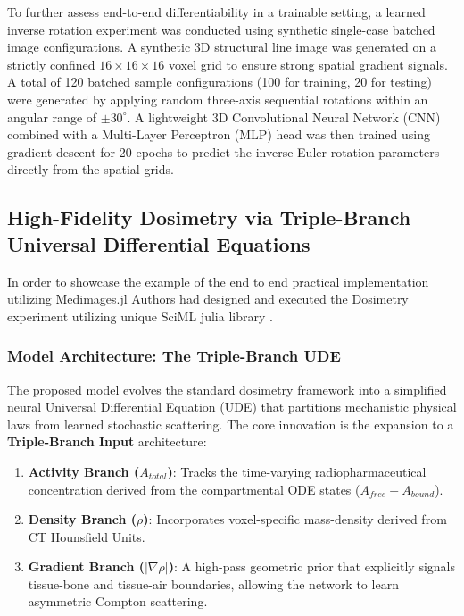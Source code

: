 \documentclass[a4paper,10pt]{elsarticle}
\begin{document}
To further assess end-to-end differentiability in a trainable setting, a learned inverse rotation experiment was conducted using synthetic single-case batched image configurations. A synthetic 3D structural line image was generated on a strictly confined $16 \times 16 \times 16$ voxel grid to ensure strong spatial gradient signals. A total of 120 batched sample configurations (100 for training, 20 for testing) were generated by applying random three-axis sequential rotations within an angular range of $\pm 30^{\circ}$. A lightweight 3D Convolutional Neural Network (CNN) combined with a Multi-Layer Perceptron (MLP) head was then trained using gradient descent for 20 epochs to predict the inverse Euler rotation parameters directly from the spatial grids.



\subsection{High-Fidelity Dosimetry via Triple-Branch Universal Differential Equations}

In order to showcase the example of the end to end practical implementation utilizing Medimages.jl Authors had designed and executed the Dosimetry experiment utilizing unique SciML julia library .  

\subsubsection{Model Architecture: The Triple-Branch UDE}
The proposed model evolves the standard dosimetry framework into a simplified neural Universal Differential Equation (UDE) that partitions mechanistic physical laws from learned stochastic scattering.  The core innovation is the expansion to a \textbf{Triple-Branch Input} architecture:
\begin{enumerate}
    \item \textbf{Activity Branch ($A_{total}$)}: Tracks the time-varying radiopharmaceutical concentration derived from the compartmental ODE states ($A_{free} + A_{bound}$).
    \item \textbf{Density Branch ($\rho$)}: Incorporates voxel-specific mass-density derived from CT Hounsfield Units.
    \item \textbf{Gradient Branch ($|\nabla \rho|$)}: A high-pass geometric prior that explicitly signals tissue-bone and tissue-air boundaries, allowing the network to learn asymmetric Compton scattering.
\end{enumerate}
\end{document}
